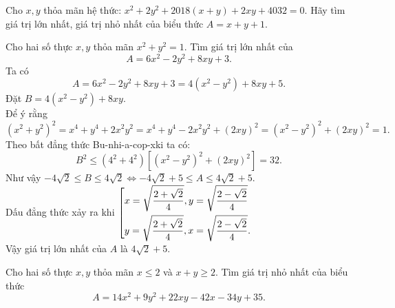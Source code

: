 \begin{bt}%
	Cho $x,y$ thỏa mãn hệ thức: $x^2+2y^2+2018(x+y)+2xy+4032=0$. Hãy tìm giá trị lớn nhất, giá trị nhỏ nhất của biểu thức $A=x+y+1$.
\end{bt}

\begin{bt}%
	Cho hai số thực $x,y$ thỏa mãn $x^2+y^2=1$.
	Tìm giá trị lớn nhất của $$A=6x^2-2y^2+8xy+3.$$
	\loigiai
	{
		Ta có $$A=6x^2-2y^2+8xy+3=4(x^2-y^2)+8xy+5.$$
		Đặt $B=4(x^2-y^2)+8xy$.\\
		Để ý rằng $(x^2+y^2)^2=x^4+y^4+2x^2y^2=x^4+y^4-2x^2y^2+(2xy)^2=(x^2-y^2)^2+(2xy)^2=1.$\\
		Theo bất đẳng thức Bu-nhi-a-cop-xki ta có:
		$$B^2 \le (4^2+4^2)[(x^2-y^2)^2+(2xy)^2]=32.$$
		Như vậy $-4\sqrt{2} \le B \le 4\sqrt{2} \Leftrightarrow -4\sqrt{2}+5 \le A \le 4\sqrt{2} +5 $.\\
		Dấu đẳng thức xảy ra khi $\left[\begin{aligned}&x=\sqrt{\dfrac{2+\sqrt{2}}{4}}, y=\sqrt{\dfrac{2-\sqrt{2}}{4}}\\&y=\sqrt{\dfrac{2+\sqrt{2}}{4}}, x=\sqrt{\dfrac{2-\sqrt{2}}{4}}.\end{aligned}\right. $ \\
		Vậy giá trị lớn nhất của $A$ là $4\sqrt{2}+5.$
	}
\end{bt}

\begin{bt}%
	Cho hai số thực $x,y$ thỏa mãn $x\le 2$ và $x+y\ge 2$. Tìm giá trị nhỏ nhất của biểu thức
	$$A=14x^2+9y^2+22xy-42x-34y+35.$$
\end{bt}


